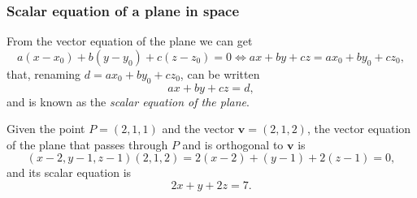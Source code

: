 \begin{frame}
\frametitle{Scalar equation of a plane in space}
From the vector equation of the plane we can get
\[
a(x-x_0)+b(y-y_0)+c(z-z_0) = 0 \Leftrightarrow ax+by+cz=ax_0+by_0+cz_0,
\]
that, renaming $d=ax_0+by_0+cz_0$, can be written
\[
ax+by+cz=d,
\]
and is known as the \emph{scalar equation of the plane}.

 Given the point $P=(2,1,1)$ and the vector $\mathbf{v}=(2,1,2)$, the vector equation of the plane that passes through $P$ and is orthogonal to $\mathbf{v}$ is
\[
(x-2,y-1,z-1)(2,1,2)=2(x-2)+(y-1)+2(z-1)=0,
\]
and its scalar equation is 
\[
2x+y+2z=7.
\] 
\end{frame}



